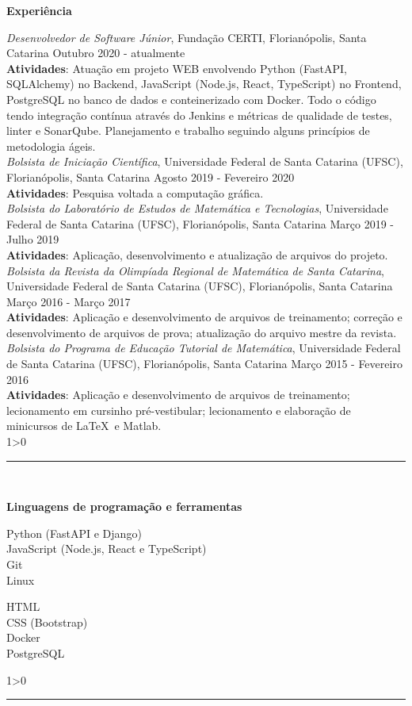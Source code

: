 \documentclass[a4paper,10pt]{article}
\newcommand{\criaSecao}[4][0]{
    \noindent
	\begin{minipage}{0.16\linewidth}
		\large{\textbf{#2}}
		\vspace{#3\baselineskip}
	\end{minipage}
	\hfill
	\begin{minipage}{0.79\linewidth}
		#4
		\ifnum0#1>0 { \hrule {\ } } \fi
	\end{minipage}
	\vspace{\baselineskip}
}
\begin{document}
    \criaSecao[1]{Experiência}{21}{
        \textit{Desenvolvedor de Software Júnior}, Fundação CERTI, Florianópolis, Santa Catarina \hfill Outubro 2020 - atualmente \\
        \textbf{Atividades}: Atuação em projeto WEB envolvendo Python (FastAPI, SQLAlchemy) no Backend, JavaScript (Node.js, React, TypeScript) no Frontend,  PostgreSQL no banco de dados e conteinerizado com Docker. Todo o código tendo integração contínua através do Jenkins e métricas de qualidade de testes, linter e SonarQube. Planejamento e trabalho seguindo alguns princípios de metodologia ágeis.  \\

        \textit{Bolsista de Iniciação Científica}, Universidade Federal de Santa Catarina (UFSC), Florianópolis, Santa Catarina \hfill Agosto 2019 - Fevereiro 2020 \\
		\textbf{Atividades}: Pesquisa voltada a computação gráfica.\\

		\textit{Bolsista do Laboratório de Estudos de Matemática e Tecnologias}, Universidade Federal de Santa Catarina (UFSC), Florianópolis, Santa Catarina \hfill Março 2019 - Julho 2019 \\
		\textbf{Atividades}: Aplicação, desenvolvimento e atualização de arquivos do projeto.\\

		\textit{Bolsista da Revista da Olimpíada Regional de Matemática de Santa Catarina}, Universidade Federal de Santa Catarina (UFSC), Florianópolis, Santa Catarina \hfill Março 2016 - Março 2017 \\
		\textbf{Atividades}: Aplicação e desenvolvimento de arquivos de treinamento; correção e desenvolvimento de arquivos de prova; atualização do arquivo mestre da revista.\\

		\textit{Bolsista do Programa de Educação Tutorial de Matemática}, Universidade Federal de Santa Catarina (UFSC), Florianópolis, Santa Catarina \hfill Março 2015 - Fevereiro 2016 \\
		\textbf{Atividades}: Aplicação e desenvolvimento de arquivos de treinamento; lecionamento em cursinho pré-vestibular; lecionamento e elaboração de minicursos de \LaTeX\ e Matlab. \\
    }

    \criaSecao[1]{Linguagens de programação e ferramentas}{2}{
        \large{\bf
			\begin{minipage}{0.6\linewidth}
				Python (FastAPI e Django)\\
				JavaScript (Node.js, React e TypeScript)\\
				Git\\
				Linux\\
			\end{minipage}
			\begin{minipage}{0.4\linewidth}
				HTML\\
				CSS (Bootstrap)\\
				Docker\\
				PostgreSQL\\
			\end{minipage}
		}
    }
\end{document}
